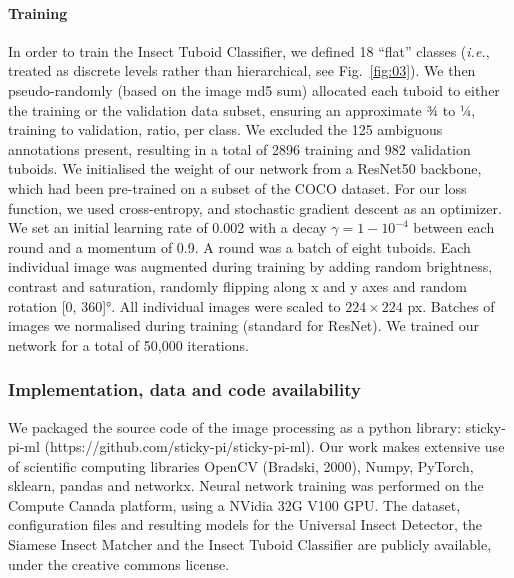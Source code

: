 \documentclass[fleqn,10pt]{wlscirep}
\begin{document}
\paragraph{Training}
In order to train the Insect Tuboid Classifier, we defined 18 “flat” classes (\emph{i.e.}, treated as discrete levels rather than hierarchical, see Fig.~\ref{fig:03}). We then pseudo-randomly (based on the image md5 sum) allocated each tuboid to either the training or the validation data subset, ensuring an approximate ¾ to ¼, training to validation, ratio, per class. We excluded the 125 ambiguous annotations present, resulting in a total of 2896 training and 982 validation tuboids. 
We initialised the weight of our network from a ResNet50 backbone, which had been pre-trained on a subset of the COCO dataset. For our loss function, we used cross-entropy, and stochastic gradient descent as an optimizer. We set an initial learning rate of 0.002 with a decay $\gamma = 1- 10^{-4}$ between each round and a momentum of 0.9. A round was a batch of eight tuboids. Each individual image was augmented during training by adding random brightness, contrast and saturation, randomly flipping along x and y axes and random rotation [0, 360]°. All individual images were scaled to $224 \times{} 224$ px. Batches of images we normalised during training (standard for ResNet). We trained our network for a total of 50,000 iterations.

\subsubsection*{Implementation, data and code availability}
We packaged the source code of the image processing as a python library: sticky-pi-ml (https://github.com/sticky-pi/sticky-pi-ml). Our work makes extensive use of scientific computing libraries OpenCV (Bradski, 2000), Numpy\cite{harris_array_2020}, PyTorch\cite{paszke_pytorch_2019}, sklearn\cite{pedregosa_scikit-learn_2011}, pandas\cite{the_pandas_development_team_pandas-devpandas_2020} and networkx\cite{hagberg_exploring_2008}. Neural network training was performed on the Compute Canada platform, using a NVidia 32G V100 GPU. The dataset, configuration files and resulting models for the Universal Insect Detector, the Siamese Insect Matcher and the Insect Tuboid Classifier are publicly available, under the creative commons license\cite{geissmann_sticky_2021}. 
\end{document}

